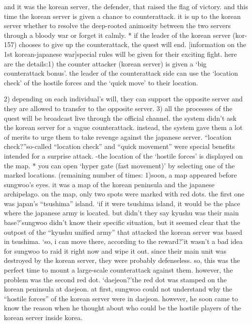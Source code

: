  and it was the korean server, the defender, that raised the flag of victory.
and this time the korean server is given a chance to counterattack.
 it is up to the korean server whether to resolve the deep-rooted animosity between the two servers through a bloody war or forget it calmly.
* if the leader of the korean server (kor-157) chooses to give up the counterattack, the quest will end.
[information on the 1st korean-japanese war]special rules will be given for their exciting fight.
 here are the details:1) the counter attacker (korean server) is given a ‘big counterattack bonus’.
 the leader of the counterattack side can use the ‘location check’ of the hostile forces and the ‘quick move’ to their location.

2) depending on each individual’s will, they can support the opposite server and they are allowed to transfer to the opposite server.
3) all the processes of the quest will be broadcast live through the official channel.
the system didn’t ask the korean server for a vague counterattack.
 instead, the system gave them a lot of merits to urge them to take revenge against the japanese server.
“location check?”so-called “location check” and “quick movement” were special benefits intended for a surprise attack.
-the location of the ‘hostile forces’ is displayed on the map.
* you can open ‘hyper gate (fast movement)’ by selecting one of the marked locations.
 (remaining number of times: 1)soon, a map appeared before sungwoo’s eyes.
 it was a map of the korean peninsula and the japanese archipelago.
 on the map, only two spots were marked with red dots.
 the first one was japan’s “tsushima” island.
‘if it were tsushima island, it would be the place where the japanese army is located.
 but didn’t they say kyushu was their main base?’sungwoo didn’t know their specific situation, but it seemed clear that the outpost of the “kyushu unified army” that attacked the korean server was based in tsushima.
‘so, i can move there, according to the reward?’it wasn’t a bad idea for sungwoo to raid it right now and wipe it out.
 since their main unit was destroyed by the korean server, they were probably defenseless.
 so, this was the perfect time to mount a large-scale counterattack against them.
however, the problem was the second red dot.
‘daejeon?’the red dot was stamped on the korean peninsula at daejeon.
 at first, sungwoo could not understand why the “hostile forces” of the korean server were in daejeon.
however, he soon came to know the reason when he thought about who could be the hostile players of the korean server inside korea.
